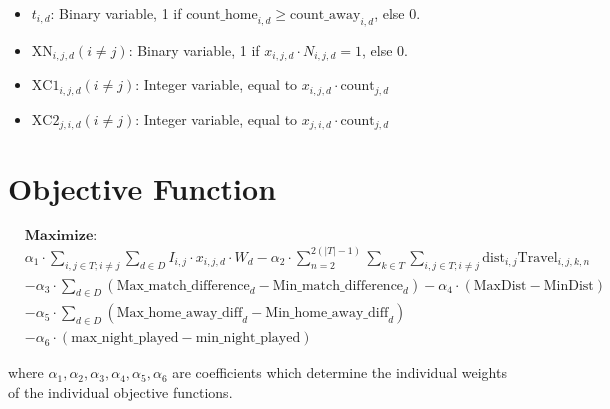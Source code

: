\documentclass[a4paper, 12pt]{article}
\begin{document}
\begin{itemize}
    \item $t_{i,d}$: Binary variable, 1 if $\text{count\_home}_{i,d} \geq \text{count\_away}_{i,d}$, else 0.
    \item $\text{XN}_{i,j,d} (i \neq j)$: Binary variable, 1 if $x_{i,j,d} \cdot N_{i,j,d} = 1$, else 0.
    \item $\text{XC1}_{i,j,d} (i \neq j)$: Integer variable, equal to $x_{i,j,d} \cdot \text{count}_{j,d}$
    \item $\text{XC2}_{j,i,d} (i \neq j)$: Integer variable, equal to $x_{j,i,d} \cdot \text{count}_{j,d}$
\end{itemize}

\section*{Objective Function}
\begin{align*}
&\textbf{Maximize: }\\ 
&\alpha_1 \cdot \sum_{i,j \in T; i \neq j} \sum_{d \in D} I_{i,j} \cdot x_{i,j,d} \cdot W_{d} - \alpha_2 \cdot \sum_{n = 2}^{2(|T| - 1)} \sum_{k \in T} \sum_{i,j \in T; i \neq j}  \text{dist}_{i,j}\text{Travel}_{i,j,k,n}  \\ 
&- \alpha_3 \cdot \sum_{d \in D} (\text{Max\_match\_difference}_{d} - \text{Min\_match\_difference}_{d}) - \alpha_4 \cdot (\text{MaxDist} - \text{MinDist})\\
&- \alpha_5 \cdot \sum_{d \in D} (\text{Max\_home\_away\_diff}_{d} - \text{Min\_home\_away\_diff}_{d}) \\
&- \alpha_6 \cdot (\text{max\_night\_played} - \text{min\_night\_played})
\end{align*}

where $\alpha_1, \alpha_2, \alpha_3, \alpha_4, \alpha_5, \alpha_6$ are coefficients which determine the individual weights of the individual objective functions.
\end{document}
